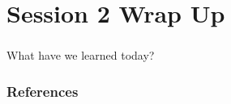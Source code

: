 \documentclass[notes, aspectratio=1610]{beamer}
\begin{document}
\section{Session 2 Wrap Up}

\begin{frame}
	\frametitle{}
	\LARGE \center What have we learned today?
\end{frame}


\begin{frame}
	\frametitle{References}
	\printbibliography
 \end{frame} 
\end{document}

